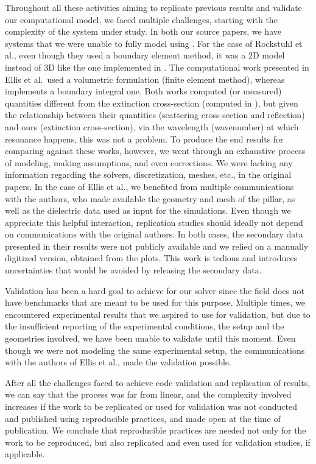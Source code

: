 
Throughout all these activities aiming to replicate previous results and validate our computational model, we faced multiple challenges, starting with the complexity of the system under study. In both our source papers, we have systems that we were unable to fully 
model using \pygbe. For the case of Rockstuhl et al., even though they used a boundary element method, it was a 2D model instead of 3D like the one implemented in \pygbe. The computational work presented in Ellis et al.\ used a volumetric 
formulation (finite element method), whereas \pygbe implements a boundary integral one. Both works computed (or measured) quantities different from the extinction cross-section (computed in \pygbe), but given the relationship between their quantities (scattering cross-section and reflection)  
and ours (extinction cross-section), via the wavelength (wavenumber) at which resonance happens, this was not a problem. To produce the end results for comparing against these works, however, we went through an 
exhaustive process of modeling, making assumptions, and even corrections. We were lacking any information regarding the solvers, discretization, meshes, etc., in the original papers. In the case of Ellis et al., we benefited from multiple communications with the authors, 
who made available the geometry and mesh of the pillar, as well as the dielectric data used as input for the simulations. Even though we appreciate this helpful interaction, replication studies should ideally not depend on communications with the original authors. 
In both cases, the secondary data presented in their results were not publicly available and we relied on a manually digitized version, obtained from the plots. This work is tedious and introduces uncertainties that would be avoided by releasing 
the secondary data.

Validation has been a hard goal to achieve for our solver since the field does not have benchmarks that are meant to be used for this purpose. Multiple times,
we encountered experimental results that we aspired to use for validation, but due to the insufficient reporting of the experimental conditions, the setup and the geometries involved, 
we have been unable to validate until this moment. Even though we were not modeling the same experimental setup, the communications with the authors of Ellis et al., made 
the validation possible.

After all the challenges faced to achieve code validation and replication of results, we can say that the process was far from  linear, 
and the complexity involved increases if the work to be replicated or used for validation was not conducted and published using reproducible practices, and made open at the time 
of publication. We conclude that reproducible practices are needed not only for the work to be reproduced, but also 
replicated and even used for validation studies, if applicable.
